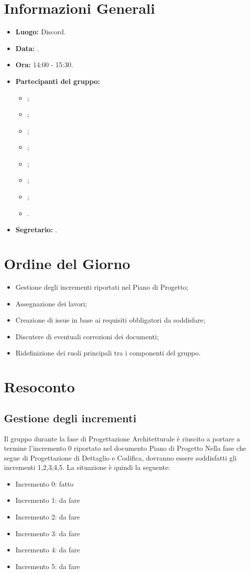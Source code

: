 \section{Informazioni Generali}
\begin{itemize}
\item \textbf{Luogo:} Discord.
\item \textbf{Data:} \Data.
\item \textbf{Ora:} 14:00 - 15:30.
\item \textbf{Partecipanti del gruppo:}
	\begin{itemize}
		\item \AT{}; 
		\item \BR{};
		\item \CE{}; 
		\item \DF{};
		\item \LD{};
		\item \MC{};
		\item \PF{};
		\item \SE{}.
	\end{itemize} 
\item \textbf{Segretario:} \SE{}.
\end{itemize}

\section{Ordine del Giorno}
\begin{itemize}
	\item Gestione degli incrementi riportati nel Piano di Progetto;
	\item Assegnazione dei lavori;
	\item Creazione di issue in base ai requisiti obbligatori da soddisfare;
	\item Discutere di eventuali correzioni dei documenti;
	\item Ridefinizione dei ruoli principali tra i componenti del gruppo.
\end{itemize}


\section{Resoconto}

\subsection{Gestione degli incrementi}
Il gruppo durante la fase di Progettazione Architetturale è riuscito a portare a termine l'incremento 0 riportato nel documento Piano di Progetto
Nella fase che segue di Progettazione di Dettaglio e Codifica, dovranno essere soddisfatti gli incrementi 1,2,3,4,5.
La situazione è quindi la seguente:
\begin{itemize}
	\item Incremento 0: fatto
	\item Incremento 1: da fare
	\item Incremento 2: da fare
	\item Incremento 3: da fare
	\item Incremento 4: da fare
	\item Incremento 5: da fare
\end{itemize}


